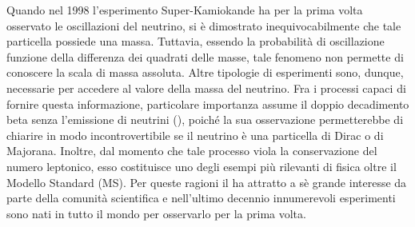Quando nel 1998 l'esperimento Super-Kamiokande ha per la prima volta osservato le oscillazioni del neutrino\cite{fukuda:prl98}, si è dimostrato inequivocabilmente che tale particella possiede una massa. 
Tuttavia, essendo la probabilità di oscillazione funzione della differenza dei quadrati delle masse, tale fenomeno non permette di conoscere la scala di massa assoluta. 
Altre tipologie di esperimenti sono, dunque, necessarie per accedere al valore della massa del neutrino.
Fra i processi capaci di fornire questa informazione, particolare importanza assume il doppio decadimento beta senza l'emissione di neutrini (\doppiobeta), poiché la sua osservazione permetterebbe di chiarire in modo incontrovertibile se il neutrino è una particella di Dirac o di Majorana.
Inoltre, dal momento che tale processo viola la conservazione del numero leptonico, esso costituisce uno degli esempi più rilevanti di fisica oltre il Modello Standard (MS).
Per queste ragioni il \doppiobeta{} ha attratto a sè grande interesse da parte della comunità scientifica e nell'ultimo decennio innumerevoli esperimenti sono nati in tutto il mondo per osservarlo per la prima volta.
%
%
%
%
%
%
%
